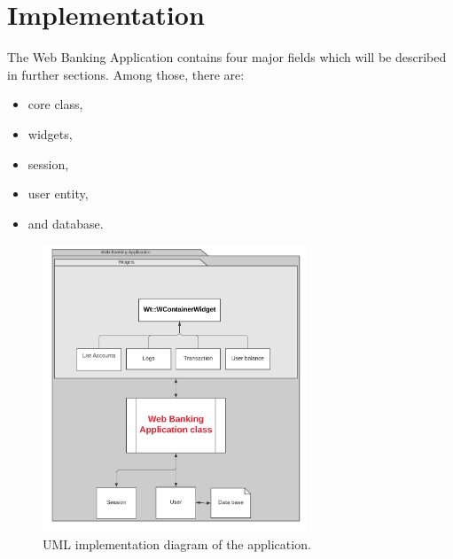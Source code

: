 \documentclass[a4paper,12pt]{book}
\begin{document}
\chapter{Implementation}

The Web Banking Application contains four major fields which will be described in further sections. Among those, there are:
  
\begin{itemize}
\setlength\itemsep{0em}
\item core class,
\item widgets,
\item session,
\item user entity,
\item and database.
\end{itemize}

\begin{figure}[H]
\centering
\includegraphics[width=0.7\textwidth]{uml2}
\caption{UML implementation diagram of the application.}
\end{figure}
\end{document}
